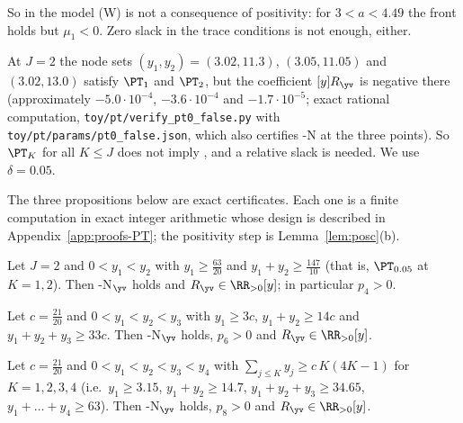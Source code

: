 So in the model \textup{(W)} is not a consequence of positivity: for $3<a<4.49$ the front holds but $\mu_1<0$.
Zero slack in the trace conditions is not enough, either.

\begin{remark}\label{rem:PT0-false}
At $J=2$ the node sets $(y_1,y_2)=(3.02,11.3)$, $(3.05,11.05)$ and $(3.02,13.0)$ satisfy $\PT_1$ and $\PT_2$, but
the coefficient $[y]R_{\yv}$ is negative there (approximately $-5.0\cdot10^{-4}$, $-3.6\cdot10^{-4}$ and
$-1.7\cdot10^{-5}$; exact rational computation, \nolinkurl{toy/pt/verify_pt0_false.py} with
\nolinkurl{toy/pt/params/pt0_false.json}, which also certifies \hyp{N} at the three points). So $\PT_K$ for all $K\le J$ does not imply \Rp, and a relative slack
is needed. We use $\delta=0.05$.
\end{remark}

The three propositions below are exact certificates. Each one is a finite computation in exact integer arithmetic
whose design is described in Appendix~\ref{app:proofs-PT}; the positivity step is Lemma~\ref{lem:posc}(b).

\begin{proposition}\label{thm:PT2}
Let $J=2$ and $0<y_1<y_2$ with $y_1\ge\frac{63}{20}$ and $y_1+y_2\ge\frac{147}{10}$ \textup{(}that is,
$\PT_{0.05}$ at $K=1,2$\textup{)}. Then \hyp{N}$_{\yv}$ holds and $R_{\yv}\in\RR_{>0}[y]$; in particular $p_4>0$.
\end{proposition}

\begin{proposition}\label{thm:PT3}
Let $c=\frac{21}{20}$ and $0<y_1<y_2<y_3$ with $y_1\ge3c$, $y_1+y_2\ge14c$ and $y_1+y_2+y_3\ge33c$. Then
\hyp{N}$_{\yv}$ holds, $p_6>0$ and $R_{\yv}\in\RR_{>0}[y]$.
\end{proposition}

\begin{proposition}\label{thm:PT4}
Let $c=\frac{21}{20}$ and $0<y_1<y_2<y_3<y_4$ with $\sum_{j\le K}y_j\ge c\,K(4K-1)$ for $K=1,2,3,4$ \textup{(}i.e.\
$y_1\ge3.15$, $y_1+y_2\ge14.7$, $y_1+y_2+y_3\ge34.65$, $y_1+\dots+y_4\ge63$\textup{)}. Then \hyp{N}$_{\yv}$ holds,
$p_8>0$ and $R_{\yv}\in\RR_{>0}[y]$.
\end{proposition}

